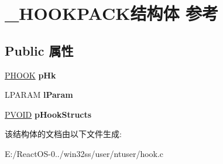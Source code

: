\hypertarget{struct___h_o_o_k_p_a_c_k}{}\section{\+\_\+\+H\+O\+O\+K\+P\+A\+C\+K结构体 参考}
\label{struct___h_o_o_k_p_a_c_k}
\subsection*{Public 属性}
\begin{DoxyCompactItemize}
\item 
\mbox{\label{struct___h_o_o_k_p_a_c_k_ab0c68b71f3ebfdb8a96b97fbfb976826}} 
\hyperlink{structtag_h_o_o_k}{P\+H\+O\+OK} {\bfseries p\+Hk}
\item 
\mbox{\label{struct___h_o_o_k_p_a_c_k_ab7833b6ac928832afa6980a06dd058b6}} 
L\+P\+A\+R\+AM {\bfseries l\+Param}
\item 
\mbox{\label{struct___h_o_o_k_p_a_c_k_a74ae570c5629280018d0a3a8721d44fa}} 
\hyperlink{interfacevoid}{P\+V\+O\+ID} {\bfseries p\+Hook\+Structs}
\end{DoxyCompactItemize}


该结构体的文档由以下文件生成\+:\begin{DoxyCompactItemize}
\item 
E\+:/\+React\+O\+S-\/0../win32ss/user/ntuser/hook.\+c\end{DoxyCompactItemize}
